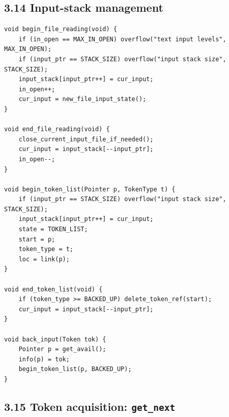 \documentclass[11pt]{article}
\begin{document}
\subsection{3.14 Input-stack management}\label{input-stack-management}

\begin{verbatim}
void begin_file_reading(void) {
    if (in_open == MAX_IN_OPEN) overflow("text input levels", MAX_IN_OPEN);
    if (input_ptr == STACK_SIZE) overflow("input stack size", STACK_SIZE);
    input_stack[input_ptr++] = cur_input;
    in_open++;
    cur_input = new_file_input_state();
}

void end_file_reading(void) {
    close_current_input_file_if_needed();
    cur_input = input_stack[--input_ptr];
    in_open--;
}

void begin_token_list(Pointer p, TokenType t) {
    if (input_ptr == STACK_SIZE) overflow("input stack size", STACK_SIZE);
    input_stack[input_ptr++] = cur_input;
    state = TOKEN_LIST;
    start = p;
    token_type = t;
    loc = link(p);
}

void end_token_list(void) {
    if (token_type >= BACKED_UP) delete_token_ref(start);
    cur_input = input_stack[--input_ptr];
}

void back_input(Token tok) {
    Pointer p = get_avail();
    info(p) = tok;
    begin_token_list(p, BACKED_UP);
}
\end{verbatim}

\subsection{\texorpdfstring{3.15 Token acquisition:
\texttt{get\_next}}{3.15 Token acquisition: get\_next}}\label{token-acquisition-get_next}
\end{document}
